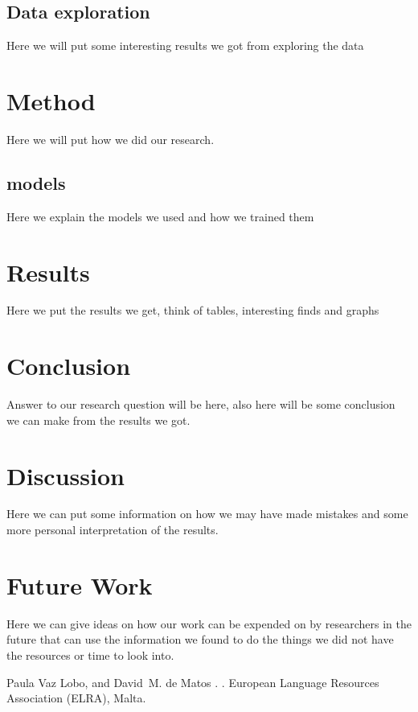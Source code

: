 \documentclass[11pt]{article}
\begin{document}
\subsection{Data exploration}

Here we will put some interesting results we got from exploring the data

\section{Method}

Here we will put how we did our research.

\subsection{models}

Here we explain the models we used and how we trained them 

\section{Results}

Here we put the results we get, think of tables, interesting finds and graphs

\section{Conclusion}

Answer to our research question will be here, also here will be some conclusion we can make from the results we got. 

\section{Discussion}

Here we can put some information on how we may have made mistakes and some more personal interpretation of the results. 

\section{Future Work}

Here we can give ideas on how our work can be expended on by researchers in the future that can use the information we found to do the things we did not have the resources or time to look into. 



\begin{thebibliography}{}

Paula Vaz Lobo, and David~M. de Matos
.
.
\newblock European Language Resources Association (ELRA), Malta.


\end{thebibliography}
\end{document}
